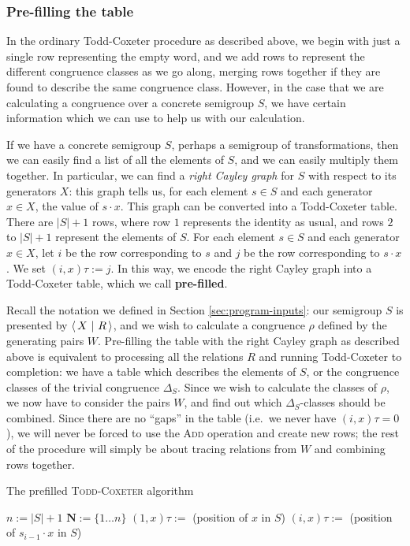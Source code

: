 \subsubsection{Pre-filling the table}
\label{sec:tc-prefill}
In the ordinary Todd-Coxeter procedure as described above, we begin with just a
single row representing the empty word, and we add rows to represent the
different congruence classes as we go along, merging rows together if they are
found to describe the same congruence class.  However, in the case that we are
calculating a congruence over a concrete semigroup $S$, we have certain
information which we can use to help us with our calculation.

If we have a concrete semigroup $S$, perhaps a semigroup of transformations,
then we can easily find a list of all the elements of $S$, and we can easily
multiply them together.  In particular, we can find a \textit{right Cayley
  graph} for $S$ with respect to its generators $X$: this graph tells us, for
each element $s \in S$ and each generator $x \in X$, the value of $s \cdot x$.
This graph can be converted into a Todd-Coxeter table.  There are $|S| + 1$
rows, where row $1$ represents the identity as usual, and rows $2$ to $|S| + 1$
represent the elements of $S$.  For each element $s \in S$ and each generator
$x \in X$, let $i$ be the row corresponding to $s$ and $j$ be the row
corresponding to $s \cdot x$.  We set $(i, x)\tau := j$.  In this way, we encode
the right Cayley graph into a Todd-Coxeter table, which we call
\textbf{pre-filled}.

Recall the notation we defined in Section \ref{sec:program-inputs}: our
semigroup $S$ is presented by $\left\langle\,X ~\middle|~ R\,\right\rangle$, and we wish to calculate a congruence
$\rho$ defined by the generating pairs $W$.  Pre-filling the table with the
right Cayley graph as described above is equivalent to processing all the
relations $R$ and running Todd-Coxeter to completion: we have a table which
describes the elements of $S$, or the congruence classes of the trivial
congruence $\Delta_S$.  Since we wish to calculate the classes of $\rho$, we now
have to consider the pairs $W$, and find out which $\Delta_S$-classes should be
combined.  Since there are no ``gaps'' in the table (i.e.~we never have
$(i,x)\tau=0$), we will never be forced to use the \textsc{Add} operation and
create new rows; the rest of the procedure will simply be about tracing
relations from $W$ and combining rows together.

\begin{algorithm}
\caption{The prefilled \textsc{Todd-Coxeter} algorithm}
\label{alg:tc-prefill}
\begin{algorithmic}[1]
\State $n := |S| + 1$
\State $\mathbf{N} := \{1 \ldots n\}$
  \State $(1, x)\tau :=$ (position of $x$ in $S$)
    \State $(i, x)\tau :=$ (position of $s_{i-1} \cdot x$ in $S$)
  \EndFor
\EndFor
{}
    \State {}
  \EndFor
\EndFor
\EndProcedure
\end{algorithmic}
\end{algorithm}

